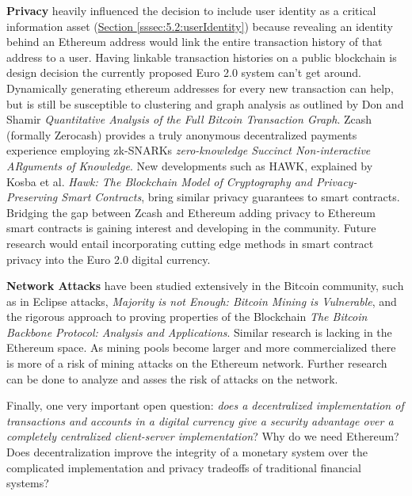 \documentclass[a4paper,12pt]{article} %
\newcommand{\hypersectionref}[1]{\hyperref[#1]{Section \ref{#1}}}
\begin{document}
{\textbf{Privacy} heavily influenced the decision to include user identity as a critical information asset (\hypersectionref{sssec:5.2:userIdentity}) because revealing an identity behind an Ethereum address would link the entire transaction history of that address to a user. Having linkable transaction histories on a public blockchain is design decision the currently proposed Euro 2.0 system can't get around. Dynamically generating ethereum addresses for every new transaction can help, but is still be susceptible to clustering and graph analysis as outlined by Don and Shamir \textit{Quantitative Analysis of the Full Bitcoin Transaction Graph}\cite{Ron2013}. Zcash (formally Zerocash) provides a truly anonymous decentralized payments experience employing zk-SNARKs \textit{zero-knowledge Succinct Non-interactive ARguments of Knowledge}\cite{zerocash}. New developments such as HAWK, explained by Kosba et al. \textit{Hawk: The Blockchain Model of Cryptography and Privacy-Preserving Smart Contracts}\cite{hawk}, bring similar privacy guarantees to smart contracts. Bridging the gap between Zcash and Ethereum adding privacy to Ethereum smart contracts is gaining interest and developing in the community\cite{ZcashEtherumUpdate}\cite{zkSNARKsBlog}\cite{zkSNARKsPaper}. Future research would entail incorporating cutting edge methods in smart contract privacy into the Euro 2.0 digital currency.

\textbf{Network Attacks} have been studied extensively in the Bitcoin community, such as in Eclipse attacks\cite{EclipseAttacks}, \textit{Majority is not Enough: Bitcoin Mining is Vulnerable}\cite{MajorityIsNotEnough}, and the rigorous approach to proving properties of the Blockchain \textit{The Bitcoin Backbone Protocol: Analysis and Applications}\cite{BitcoinBackboneProtocol}. Similar research is lacking in the Ethereum space. As mining pools become larger and more commercialized there is more of a risk of mining attacks on the Ethereum network. Further research can be done to analyze and asses the risk of attacks on the network.

Finally, one very important open question: \textit{does a decentralized implementation of transactions and accounts in a digital currency give a security advantage over a completely centralized client-server implementation}? Why do we need Ethereum? Does decentralization improve the integrity of a monetary system over the complicated implementation and privacy tradeoffs of traditional financial systems?

\pagebreak

}
\end{document}
